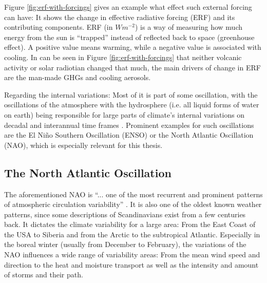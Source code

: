 Figure \ref{fig:erf-with-forcings} gives an example what effect such external forcing can have: It shows the change in effective radiative forcing (ERF) and its contributing components. 
ERF (in $Wm^{-2}$) is a way of measuring how much energy from the sun is \enquote{trapped} instead of reflected back to space (greenhouse effect). 
A positive value means warming, while a negative value is associated with cooling. 
In can be seen in Figure \ref{fig:erf-with-forcings} that neither volcanic activity or solar radiotian changed that much, the main drivers of change in ERF are the man-made GHGs and cooling aerosols. \cite{intergovernmental_panel_on_climate_change_ipcc_climate_2023}

Regarding the internal variations: Most of it is part of some oscillation, with the oscillations of the atmosphere with the hydrosphere (i.e. all liquid forms of water on earth) being responsible for large parts of climate's internal variations on decadal and interannual time frames \cite{vietinghoffdiss}. 
Prominent examples for such oscillations are the El Niño Southern Oscillation (ENSO) or the North Atlantic Oscillation (NAO), which is especially relevant for this thesis. 


\subsection{The North Atlantic Oscillation}
\label{sec:nao}

The aforementioned NAO is \enquote{... one of the most recurrent and prominent patterns of atmospheric circulation variability} \cite{hurrell_overview_2003}. 
It is also one of the oldest known weather patterns, since some descriptions of Scandinavians exist from a few centuries back. 
It dictates the climate variability for a large area: From the East Coast of the USA to Siberia and from the Arctic to the subtropical Atlantic. 
Especially in the boreal winter (usually from December to February), the variations of the NAO influences a wide range of variability areas: From the mean wind speed and direction to the heat and moisture transport as well as the intensity and amount of storms and their path. 

